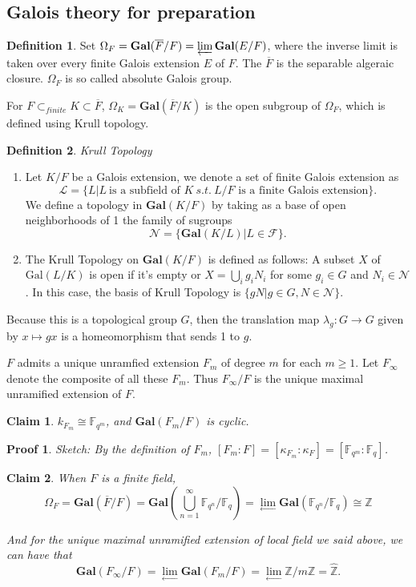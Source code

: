 \documentclass[12pt,a4paper,english]{article}
\theoremstyle{definition}
\newtheorem{defi}{Definition}[section]
\theoremstyle{plain}
\newtheorem{cla}{Claim}
\newtheorem{pf}{Proof}
\begin{document}
\subsection{Galois theory for preparation}
\begin{defi}
Set $\Omega_{F}=\textbf{Gal}(\overline{F}/F)=\varprojlim\textbf{Gal}(E/F)$, where the inverse limit is taken over every finite Galois extension $E$ of $F$. The $\overline{F}$ is the separable algeraic closure. $\Omega_{F}$ is so called absolute Galois group.
\end{defi}
 For $F\subset_{finite} K\subset\overline{F}$, $\Omega_{K}=\textbf{Gal}(\overline{F}/K)$ is the open subgroup of $\Omega_{F}$, which is defined using Krull topology.
 \begin{defi}
\emph{Krull Topology}
\begin{enumerate}
    \item Let $K/F$ be a Galois extension, we denote a set of finite Galois extension as
$$\mathcal{L}=\{L|L\ \text{is a subfield of }K \ s.t.\ L/F \text{\ is a finite Galois extension}\}.$$
We define a topology in $\textbf{Gal}(K/F)$ by taking as a base of open neighborhoods of 1 the family of sugroups 
$$\mathcal{N}=\{\textbf{Gal}(K/L)|L\in \mathcal{F}\}.$$
\item The Krull Topology on $\textbf{Gal}(K/F)$ is defined as follows:  A subset $X$ of $\text{Gal}(L/K)$ is open if it's empty or $X=\bigcup\limits_{i}g_{i}N_{i}$ for some $g_{i}\in G$ and $N_{i}\in\mathcal{N}$. In this case, the basis of Krull Topology is $\{gN|g\in G,N\in\mathcal{N}\}.$
\end{enumerate}
Because this is a topological group $G$, then the translation map $\lambda_{g}:G\rightarrow G$ given by $x\mapsto gx$ is a homeomorphism that sends 1 to $g$. 
\end{defi}
 $F$ admits a unique unramfied extension $F_{m}$ of degree $m$ for each $m\geq 1$. Let $F_{\infty}$ denote the composite of all these $F_{m}$. Thus $F_{\infty}/F$ is the unique maximal unramified extension of $F$.
\begin{cla}
$k_{F_{m}}\cong \mathbb{F}_{q^{m}}$, and $\textbf{Gal}(F_{m}/F)$ is cyclic.
\end{cla}
\begin{pf}
Sketch: By the definition of $F_{m}$, $[F_{m}:F]=[\kappa_{F_{m}}:\kappa_{F}]=[\mathbb{F}_{q^{m}}:\mathbb{F}_{q}]$.
\end{pf}
 \begin{cla}
 When $F$ is a finite field, 
 \begin{equation*}
     \Omega_{F}=\textbf{Gal}(\overline{F}/F)=\textbf{Gal}(\bigcup\limits^{\infty}_{n=1}\mathbb{F}_{q^{n}}/\mathbb{F}_{q})=\lim\limits_{\leftarrow}\textbf{Gal}(\mathbb{F}_{q^{n}}/\mathbb{F}_{q})\cong\hat{\mathbb{Z}}
 \end{equation*}
 
 And for the unique maximal unramified extension of local field we said above, we can have that 
 \begin{equation*}
     \textbf{Gal}(F_{\infty}/F)=\lim\limits_{\leftarrow} \textbf{Gal}(F_{m}/F)=\lim_{\leftarrow}\mathbb{Z}/m\mathbb{Z}=\hat{\mathbb{Z}}.
 \end{equation*}
 \end{cla}
\end{document}
